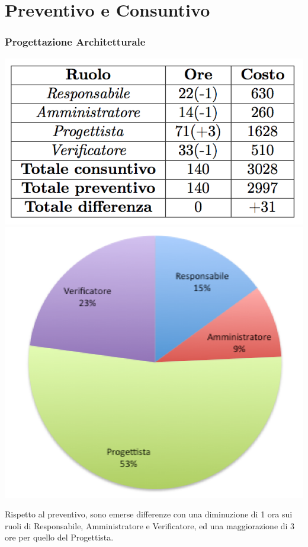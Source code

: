 \section{Preventivo e Consuntivo}
\begin{frame}
  \frametitle{Progettazione Architetturale}
  \begin{center}
  	\includegraphics[scale=0.5]{img/prevPA}
  	\includegraphics[scale=0.4]{img/cakePA}
  \end{center}
Rispetto al preventivo, sono emerse differenze con una diminuzione di 1 ora sui ruoli di Responsabile, Amministratore e Verificatore, ed una maggiorazione di 3 ore per quello del Progettista.
\end{frame}

